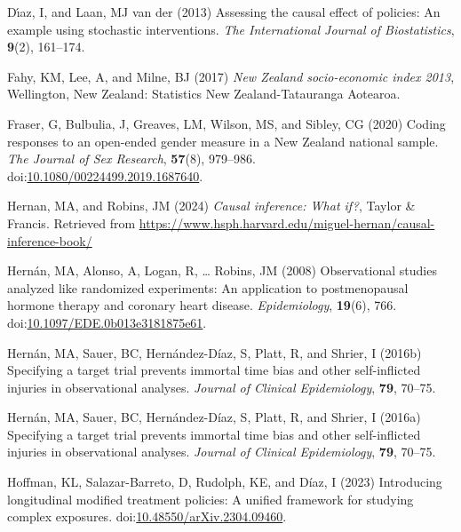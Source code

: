 \documentclass[
  single column]{article}
\newlength{\cslhangindent}
\newenvironment{CSLReferences}[2] %
 {\begin{list}{}{%
  \setlength{\itemindent}{0pt}
  \setlength{\leftmargin}{0pt}
  \setlength{\parsep}{0pt}
  \ifodd #1
   \setlength{\leftmargin}{\cslhangindent}
   \setlength{\itemindent}{-1\cslhangindent}
  \fi
  \setlength{\itemsep}{#2\baselineskip}}}
 {\end{list}}
\begin{document}
\begin{CSLReferences}{1}{0}
Dı́az, I, and Laan, MJ van der (2013) Assessing the causal effect of
policies: An example using stochastic interventions. \emph{The
International Journal of Biostatistics}, \textbf{9}(2), 161--174.

Fahy, KM, Lee, A, and Milne, BJ (2017) \emph{{N}ew {Z}ealand
socio-economic index 2013}, Wellington, New Zealand: Statistics New
Zealand-Tatauranga Aotearoa.

Fraser, G, Bulbulia, J, Greaves, LM, Wilson, MS, and Sibley, CG (2020)
Coding responses to an open-ended gender measure in a {N}ew {Z}ealand
national sample. \emph{The Journal of Sex Research}, \textbf{57}(8),
979--986.
doi:\href{https://doi.org/10.1080/00224499.2019.1687640}{10.1080/00224499.2019.1687640}.

Hernan, MA, and Robins, JM (2024) \emph{Causal inference: What if?},
Taylor \& Francis. Retrieved from
\url{https://www.hsph.harvard.edu/miguel-hernan/causal-inference-book/}

Hernán, MA, Alonso, A, Logan, R, \ldots{} Robins, JM (2008)
Observational studies analyzed like randomized experiments: An
application to postmenopausal hormone therapy and coronary heart
disease. \emph{Epidemiology}, \textbf{19}(6), 766.
doi:\href{https://doi.org/10.1097/EDE.0b013e3181875e61}{10.1097/EDE.0b013e3181875e61}.

Hernán, MA, Sauer, BC, Hernández-Díaz, S, Platt, R, and Shrier, I
(2016b) Specifying a target trial prevents immortal time bias and other
self-inflicted injuries in observational analyses. \emph{Journal of
Clinical Epidemiology}, \textbf{79}, 70--75.

Hernán, MA, Sauer, BC, Hernández-Díaz, S, Platt, R, and Shrier, I
(2016a) Specifying a target trial prevents immortal time bias and other
self-inflicted injuries in observational analyses. \emph{Journal of
Clinical Epidemiology}, \textbf{79}, 70--75.

Hoffman, KL, Salazar-Barreto, D, Rudolph, KE, and Díaz, I (2023)
Introducing longitudinal modified treatment policies: A unified
framework for studying complex exposures.
doi:\href{https://doi.org/10.48550/arXiv.2304.09460}{10.48550/arXiv.2304.09460}.


\end{CSLReferences}
\end{document}
